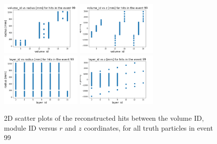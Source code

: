 \begin{figure}[!htb]
\centering
\includegraphics[width=0.35\textwidth]{plots/DataExploration_volume_id_r.png}
\includegraphics[width=0.35\textwidth]{plots/DataExploration_volume_id_z.png}\\
\includegraphics[width=0.35\textwidth]{plots/DataExploration_layer_id_r.png}
\includegraphics[width=0.35\textwidth]{plots/DataExploration_layer_id_z.png}
\caption{2D scatter plots of the reconstructed hits between the volume ID, module ID versus $r$ and $z$ coordinates, for all truth particles in event 99}
\label{fig:ScatterPlotHits}
\end{figure}

%



